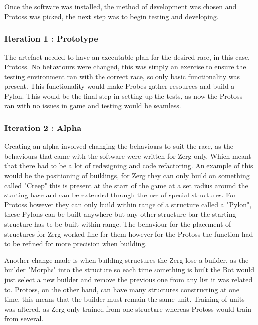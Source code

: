 \documentclass[journal]{IEEEtran}
\begin{document}
	Once the software was installed, the method of development was chosen and Protoss was picked, the next step was to begin testing and developing. 
	\newline
	
	\subsubsection{Iteration 1 : Prototype}
	The artefact needed to have an executable plan for the desired race, in this case, Protoss. No behaviours were changed, this was simply an exercise to ensure the testing environment ran with the correct race, so only basic functionality was present. This functionality would make Probes gather resources and build a Pylon. This would be the final step in setting up the tests, as now the Protoss ran with no issues in game and testing would be seamless.
	\newline
	
	\subsubsection{Iteration 2 : Alpha}
	Creating an alpha involved changing the behaviours to suit the race, as the behaviours that came with the software were written for Zerg only. Which meant that there had to be a lot of redesigning and code refactoring. An example of this would be the positioning of buildings, for Zerg they can only build on something called "Creep" this is present at the start of the game at a set radius around the starting base and can be extended through the use of special structures. For Protoss however they can only build within range of a structure called a "Pylon", these Pylons can be built anywhere but any other structure bar the starting structure has to be built within range. The behaviour for the placement of structures for Zerg worked fine for them however for the Protoss the function had to be refined for more precision when building. 
	
	Another change made is when building structures the Zerg lose a builder, as the builder "Morphs" into the structure so each time something is built the Bot would just select a new builder and remove the previous one from any list it was related to. Protoss, on the other hand, can have many structures constructing at one time, this means that the builder must remain the same unit. Training of units was altered, as Zerg only trained from one structure whereas Protoss would train from several.
	
\end{document}
